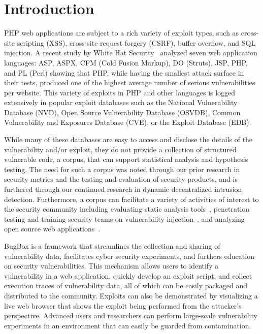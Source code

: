 \documentclass[letterpaper,twocolumn,10pt]{article}
\begin{document}
\section{Introduction}
PHP web applications are subject to a rich variety of exploit types, such as cross-site scripting (XSS), cross-site request forgery (CSRF), buffer overflow, and SQL injection.  A recent study by White Hat Security~\cite{WhiteHat:2010:Online} analyzed seven web application languages: ASP, ASPX, CFM (Cold Fusion Markup), DO (Struts), JSP, PHP, and PL (Perl) showing that PHP, while having the smallest attack surface in their tests, produced one of the highest average number of serious vulnerabilities per website.  This variety of exploits in PHP and other languages is logged extensively in popular exploit databases such as the National Vulnerability Database (NVD), Open Source Vulnerability Database (OSVDB), Common Vulnerability and Exposures Database (CVE), or the Exploit Database (EDB).\par

While many of these databases are easy to access and disclose the details of the vulnerability and/or exploit, they do not provide a collection of structured vulnerable code, a corpus, that can support statistical analysis and hypothesis testing.  The need for such a corpus was noted through our prior research in security metrics and the testing and evaluation of security products, and is furthered through our continued research in dynamic decentralized intrusion detection.  Furthermore, a corpus can facilitate a variety of activities of interest to the security community including evaluating static analysis tools~\cite{Zitser:2004:TSA:1041685.1029911}, penetration testing and training security teams on vulnerability injection~\cite{4725309}, and analyzing open source web applications~\cite{DBLP:journals/ese/HuynhM10}.  \par

BugBox is a framework that streamlines the collection and sharing of vulnerability data, facilitates cyber security experiments, and furthers education on security vulnerabilities.  This mechanism allows users to identify a vulnerability in a web application, quickly develop an exploit script, and collect execution traces of vulnerability data, all of which can be easily packaged and distributed to the community. Exploits can also be demonstrated by visualizing a live web browser that shows the exploit being performed from the attacker's perspective. Advanced users and researchers can perform large-scale vulnerability experiments in an environment that can easily be guarded from contamination.
\end{document}
